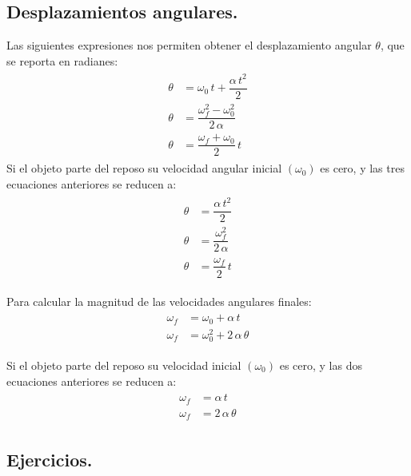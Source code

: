 \documentclass[14pt]{extarticle}
\begin{document}
\subsection{Desplazamientos angulares.}

Las siguientes expresiones nos permiten obtener el desplazamiento angular $\theta$, que se reporta en radianes:
\begin{eqnarray*}
\begin{aligned}
\theta &= \omega_{0} \, t + \dfrac{\alpha \, t^{2}}{2} \\[0.5em] 
\theta &= \dfrac{\omega_{f}^{2} - \omega_{0}^{2}}{2 \, \alpha} \\[0.5em] 
\theta &= \dfrac{\omega_{f} + \omega_{0}}{2} \, t
\end{aligned}
\end{eqnarray*}
Si el objeto parte del reposo su velocidad angular inicial $(\omega_{0})$ es cero, y las tres ecuaciones anteriores se reducen a:
\begin{eqnarray*}
\begin{aligned}
\theta &= \dfrac{\alpha \, t^{2}}{2} \\[0.5em] 
\theta &= \dfrac{\omega_{f}^{2}}{2 \, \alpha} \\[0.5em] 
\theta &= \dfrac{\omega_{f}}{2} \, t
\end{aligned}
\end{eqnarray*}

Para calcular la magnitud de las velocidades angulares finales:
\begin{eqnarray*}
\begin{aligned}
\omega_{f} &= \omega_{0} + \alpha \, t \\[0.5em] 
\omega_{f} &= \omega_{0}^{2} + 2 \, \alpha \, \theta
\end{aligned}
\end{eqnarray*}

Si el objeto parte del reposo su velocidad inicial $(\omega_{0})$ es cero, y las dos ecuaciones anteriores se reducen a:
\begin{eqnarray*}
\begin{aligned}
\omega_{f} &= \alpha \, t \\[0.5em] 
\omega_{f} &= 2 \, \alpha \, \theta
\end{aligned}
\end{eqnarray*}

\subsection{Ejercicios.}
\end{document}
